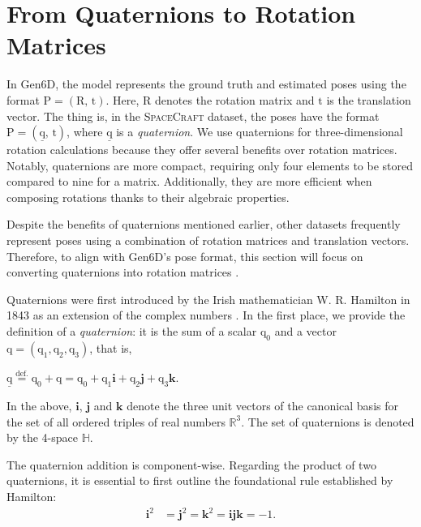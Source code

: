 \section{From Quaternions to Rotation Matrices}

In Gen6D, the model represents the ground truth and estimated poses using the format ${\bm{\mathrm{P}}}=(\bm{\mathrm{R}},\,\bm{\mathrm{t}})$. Here, $\bm{\mathrm{R}}$ denotes the rotation matrix and $\bm{\mathrm{t}}$ is the translation vector.
The thing is, in the \textsc{SpaceCraft} dataset, the poses have the format ${\bm{\mathrm{P}}}=(\underline{\bm{\mathrm{q}}},\,\bm{\mathrm{t}})$, where $\underline{\bm{\mathrm{q}}}$ is a \textit{quaternion}. We use quaternions for three-dimensional rotation calculations because they offer several benefits over rotation matrices. Notably, quaternions are more compact, requiring only four elements to be stored compared to nine for a matrix. Additionally, they are more efficient when composing rotations thanks to their algebraic properties.

Despite the benefits of quaternions mentioned earlier, other datasets frequently represent poses using a combination of rotation matrices and translation vectors. Therefore, to align with Gen6D's pose format, this section will focus on converting quaternions into rotation matrices \cite{jia2022quaternions}.

\bigbreak 

Quaternions were first introduced by the Irish mathematician W. R. Hamilton in 1843 as an extension of the complex numbers \cite{Hamilton1866}. In the first place, we provide the definition of a \textit{quaternion}: it is the sum of a scalar $\mathrm{q}_0$ and a vector $\bm{\mathrm{q}}=(\mathrm{q}_1, \mathrm{q}_2, \mathrm{q}_3)$, that is,
\begin{center}
	$\underline{\bm{\mathrm{q}}} \stackrel{\text{def.}}{=} \mathrm{q}_0 + \bm{\mathrm{q}} = \mathrm{q}_0 + \mathrm{q}_1\bm{i} + \mathrm{q}_2\bm{j} + \mathrm{q}_3\bm{k}$.
\end{center}

\noindent In the above, $\bm{i}$, $\bm{j}$ and $\bm{k}$ denote the three unit vectors of the canonical basis for 
the set of all ordered triples of real numbers $\mathbb{R}^3$. The set of quaternions is denoted by the 4-space $\mathbb{H}$.

\bigbreak 
The quaternion addition is component-wise. Regarding the product of two quaternions, it is essential to first outline the foundational rule established by \mbox{Hamilton}:
\begin{align*}
	\bm{i}^2 &= \bm{j}^2 = \bm{k}^2 = \bm{ijk}= -1.
\end{align*}


